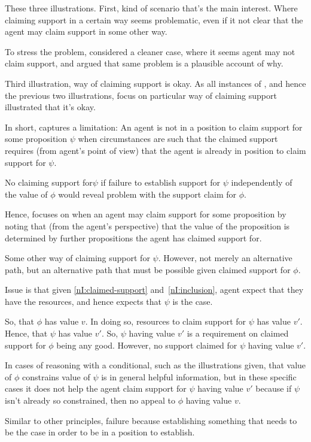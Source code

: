 \begin{note}
  These three illustrations.
  First, kind of scenario that's the main interest.
  Where claiming support in a certain way seems problematic, even if it not clear that the agent may claim support in some other way.

  To stress the problem, considered a cleaner case, where it seems agent may not claim support, and argued that same problem is a plausible account of why.

  Third illustration, way of claiming support is okay.
  As all instances of \nI{}, and hence the previous two illustrations, focus on particular way of claiming support illustrated that it's okay.
\end{note}

\begin{note}[Intuition]
  In short, \nI{} captures a limitation: An agent is not in a position to claim support for some proposition \(\psi\) when circumstances are such that the claimed support requires (from agent's point of view) that the agent is already in position to claim support for \(\psi\).

  No claiming support for\(\psi\) if failure to establish support for \(\psi\) independently of the value of \(\phi\) would reveal problem with the support claim for \(\phi\).

  Hence, \nI{} focuses on when an agent may claim support for some proposition by noting that (from the agent's perspective) that the value of the proposition is determined by further propositions the agent has claimed support for.

  Some other way of claiming support for \(\psi\).
  However, not merely an alternative path, but an alternative path that must be possible given claimed support for \(\phi\).

  Issue is that given \ref{nI:claimed-support} and~\ref{nI:inclusion}, agent expect that they have the resources, and hence expects that \(\psi\) is the case.

  So, that \(\phi\) has value \(v\).
  In doing so, resources to claim support for \(\psi\) has value \(v'\).
  Hence, that \(\psi\) has value \(v'\).
  So, \(\psi\) having value \(v'\) is a requirement on claimed support for \(\phi\) being any good.
  However, no support claimed for \(\psi\) having value \(v'\).

  In cases of reasoning with a conditional, such as the illustrations given, that value of \(\phi\) constrains value of \(\psi\) is in general helpful information, but in these specific cases it does not help the agent claim support for \(\psi\) having value \(v'\) because if \(\psi\) isn't already so constrained, then no appeal to \(\phi\) having value \(v\).

  Similar to other principles, failure because establishing something that needs to be the case in order to be in a position to establish.
\end{note}

